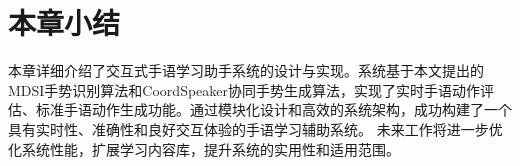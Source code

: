 
    
    

    
\section{本章小结}
本章详细介绍了交互式手语学习助手系统的设计与实现。系统基于本文提出的MDSI手势识别算法和CoordSpeaker协同手势生成算法，实现了实时手语动作评估、标准手语动作生成功能。通过模块化设计和高效的系统架构，成功构建了一个具有实时性、准确性和良好交互体验的手语学习辅助系统。%
未来工作将进一步优化系统性能，扩展学习内容库，提升系统的实用性和适用范围。


